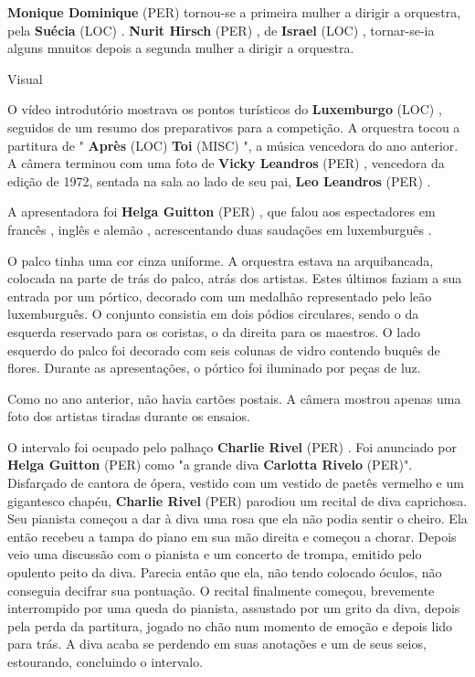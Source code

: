 \documentclass[12pt,a4paper]{article}
\begin{document}
\textbf{Monique Dominique} (PER) tornou-se a primeira mulher a dirigir a orquestra, pela \textbf{Suécia} (LOC) . \textbf{Nurit Hirsch} (PER) , de \textbf{Israel} (LOC) , tornar-se-ia alguns mnuitos depois a segunda mulher a dirigir a orquestra.



Visual

O vídeo introdutório mostrava os pontos turísticos do \textbf{Luxemburgo} (LOC) , seguidos de um resumo dos preparativos para a competição. A orquestra tocou a partitura de " \textbf{Après} (LOC) \textbf{Toi} (MISC) ", a música vencedora do ano anterior. A câmera terminou com uma foto de \textbf{Vicky Leandros} (PER) , vencedora da edição de 1972, sentada na sala ao lado de seu pai, \textbf{Leo Leandros} (PER) .

A apresentadora foi \textbf{Helga Guitton} (PER) , que falou aos espectadores em francês , inglês e alemão , acrescentando duas saudações em luxemburguês .

O palco tinha uma cor cinza uniforme. A orquestra estava na arquibancada, colocada na parte de trás do palco, atrás dos artistas. Estes últimos faziam a sua entrada por um pórtico, decorado com um medalhão representado pelo leão luxemburguês. O conjunto consistia em dois pódios circulares, sendo o da esquerda reservado para os coristas, o da direita para os maestros. O lado esquerdo do palco foi decorado com seis colunas de vidro contendo buquês de flores. Durante as apresentações, o pórtico foi iluminado por peças de luz.

Como no ano anterior, não havia cartões postais. A câmera mostrou apenas uma foto dos artistas tiradas durante os ensaios.

O intervalo foi ocupado pelo palhaço \textbf{Charlie Rivel} (PER) . Foi anunciado por \textbf{Helga Guitton} (PER) como "a grande diva \textbf{Carlotta Rivelo} (PER)". Disfarçado de cantora de ópera, vestido com um vestido de paetês vermelho e um gigantesco chapéu, \textbf{Charlie Rivel} (PER) parodiou um recital de diva caprichosa. Seu pianista começou a dar à diva uma rosa que ela não podia sentir o cheiro. Ela então recebeu a tampa do piano em sua mão direita e começou a chorar. Depois veio uma discussão com o pianista e um concerto de trompa, emitido pelo opulento peito da diva. Parecia então que ela, não tendo colocado óculos, não conseguia decifrar sua pontuação. O recital finalmente começou, brevemente interrompido por uma queda do pianista, assustado por um grito da diva, depois pela perda da partitura, jogado no chão num momento de emoção e depois lido para trás. A diva acaba se perdendo em suas anotações e um de seus seios, estourando, concluindo o intervalo.
\end{document}
